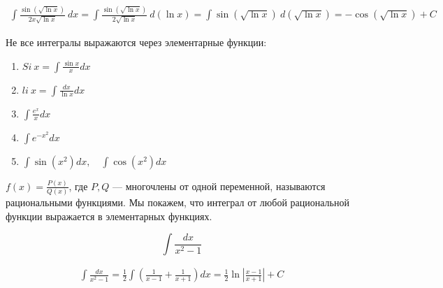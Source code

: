 \begin{gather*}
    \int \frac{\sin ( \sqrt{\ln x} ) }{2x \sqrt{\ln x}} \: dx
    =
    \int \frac{\sin ( \sqrt{\ln x} ) }{2 \sqrt{\ln x}} \: d (\ln x)
    =
    \int \sin ( \sqrt{\ln x} ) \: d (\sqrt{\ln x})
    =
    - \cos (\sqrt{\ln x}) + C
\end{gather*}

Не все интегралы выражаются через элементарные функции:
\begin{enumerate}
    \item
        \(
            \displaystyle
            Si \: x = \int \frac{\sin x}{x} dx
        \)
    \item
        \(
            \displaystyle
            li \: x = \int \frac{dx}{\ln x} dx
        \)
    \item
        \(
            \displaystyle
            \int \frac{e^x}{x} dx
        \)
    \item
        \(
            \displaystyle
            \int e^{-x^2} dx
        \)
    \item
        \(
            \displaystyle
            \int \sin (x^2) dx, \quad \int \cos (x^2) dx
        \)
\end{enumerate}

\( f(x) = \frac{P(x)}{Q(x)} \), где \( P, Q \) --- многочлены от одной переменной, называются рациональными функциями.
Мы покажем, что интеграл от любой рациональной функции выражается в элементарных функциях.

\begin{example}{}{}
    \[
        \int \frac{dx}{x^2 - 1}
    \]
\end{example}

\begin{gather*}
    \int \frac{dx}{x^2 - 1}
    =
    \frac{1}{2} \int \left( \frac{1}{x - 1} + \frac{1}{x + 1} \right) dx
    =
    \frac{1}{2} \ln \left| \frac{x - 1}{x + 1} \right| + C
\end{gather*}

